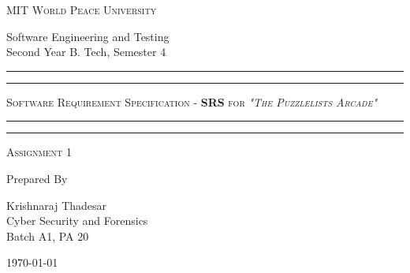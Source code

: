 \documentclass[11pt]{article}
\begin{document}
\begin{titlepage}
	\centering


	\huge\textsc{
		MIT World Peace University
	}\\

	\vspace{0.75\baselineskip} %

	\LARGE{
		Software Engineering and Testing\\
		Second Year B. Tech, Semester 4
	}

	\vfill %


	\rule{\textwidth}{1.6pt}\vspace*{-\baselineskip}\vspace*{2pt}
	\rule{\textwidth}{0.6pt}
	\vspace{0.75\baselineskip} %



	\huge{\textsc{
			Software Requirement Specification - \textbf{SRS} for
			\textit{"The Puzzlelists Arcade"}
		}} \\



	\vspace{0.5\baselineskip} %
	\rule{\textwidth}{0.6pt}\vspace*{-\baselineskip}\vspace*{2.8pt}
	\rule{\textwidth}{1.6pt}

	\vspace{1\baselineskip} %


	\LARGE\textsc{
		Assignment 1
	} %
	\vfill


	Prepared By
	\vspace{0.5\baselineskip} %

	\Large{
		Krishnaraj Thadesar \\
		Cyber Security and Forensics\\
		Batch A1, PA 20
	}


	\vspace{0.5\baselineskip} %
	\today

\end{titlepage}
\end{document}
